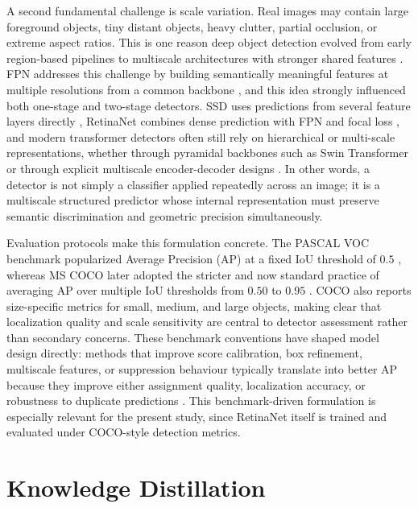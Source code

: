A second fundamental challenge is scale variation. Real images may contain large foreground objects, tiny distant objects, heavy clutter, partial occlusion, or extreme aspect ratios. This is one reason deep object detection evolved from early region-based pipelines to multiscale architectures with stronger shared features \cite{girshick2014rcnn,ren2015faster}. FPN addresses this challenge by building semantically meaningful features at multiple resolutions from a common backbone \cite{lin2017fpn}, and this idea strongly influenced both one-stage and two-stage detectors. SSD uses predictions from several feature layers directly \cite{liu2016ssd}, RetinaNet combines dense prediction with FPN and focal loss \cite{lin2017focal}, and modern transformer detectors often still rely on hierarchical or multi-scale representations, whether through pyramidal backbones such as Swin Transformer or through explicit multiscale encoder-decoder designs \cite{liu2021swin,carion2020detr}. In other words, a detector is not simply a classifier applied repeatedly across an image; it is a multiscale structured predictor whose internal representation must preserve semantic discrimination and geometric precision simultaneously.

Evaluation protocols make this formulation concrete. The PASCAL VOC benchmark popularized Average Precision (AP) at a fixed IoU threshold of $0.5$ \cite{everingham2010voc}, whereas MS COCO later adopted the stricter and now standard practice of averaging AP over multiple IoU thresholds from $0.50$ to $0.95$ \cite{lin2014coco}. COCO also reports size-specific metrics for small, medium, and large objects, making clear that localization quality and scale sensitivity are central to detector assessment rather than secondary concerns. These benchmark conventions have shaped model design directly: methods that improve score calibration, box refinement, multiscale features, or suppression behaviour typically translate into better AP because they improve either assignment quality, localization accuracy, or robustness to duplicate predictions \cite{lin2014coco,lin2017fpn,lin2017focal,bodla2017softnms,rezatofighi2019giou}. This benchmark-driven formulation is especially relevant for the present study, since RetinaNet itself is trained and evaluated under COCO-style detection metrics.

\section{Knowledge Distillation}

